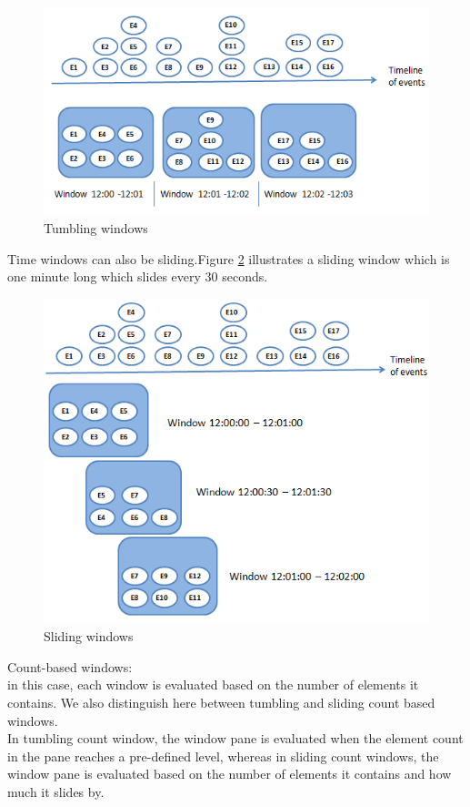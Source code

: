 \begin{itemize}
\begin{description}
\begin{description}
				\begin{figure}[h!]
					\centering
					\includegraphics[scale=0.7]{graphics/thumbling.PNG} 
					\caption{ Tumbling windows} \label{win1} 
				\end{figure}
\end{description}

 Time windows can also be sliding.Figure \ref{win2} illustrates a sliding window which is one minute long which slides every 30 seconds.
				\begin{figure}[h!]
					\centering
					\includegraphics[scale=0.7]{graphics/sliding.PNG} 
					\caption{ Sliding windows} \label{win2} 
				\end{figure}

\item[-] Count-based windows: \\
				in this case, each window is evaluated based on the number of elements it contains. We also distinguish here between tumbling and sliding count based windows. \\
In tumbling count window, the window pane is evaluated when the element count in the pane reaches a pre-defined level, whereas in sliding count windows, the window pane is evaluated based on the number of elements it contains and how much it slides by.
				


\end{description}
\end{itemize}
